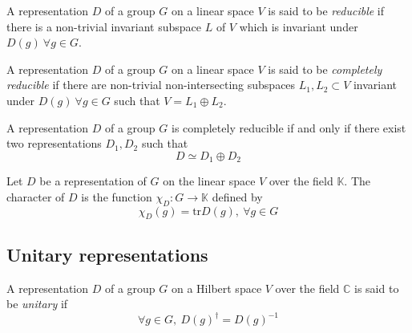 \begin{definition}
    A representation $D$ of a group $G$ on a linear space $V$ is said to be \emph{reducible} if there is a non-trivial invariant subspace $L$ of $V$ which is invariant under $D(g)\ \forall g \in G$.
\end{definition}

\begin{definition}
    A representation $D$ of a group $G$ on a linear space $V$ is said to be \emph{completely reducible} if there are non-trivial non-intersecting subspaces $L_1, L_2 \subset V$ invariant under $D(g)\ \forall g \in G$ such that $V = L_1 \oplus L_2$. 
\end{definition}

\begin{proposition}
    A representation $D$ of a group $G$ is completely reducible if and only if there exist two representations $D_1, D_2$ such that
    \begin{equation*}
        D \simeq D_1 \oplus D_2
    \end{equation*}
\end{proposition}



\begin{definition}[Character]
    Let $D$ be a representation of $G$ on the linear space $V$ over the field $\mathbb{K}$. The character of $D$ is the function $\chi_D: G \rightarrow \mathbb{K}$ defined by 
    \begin{equation*}
        \chi_D(g) = \text{tr}D(g),\ \forall g \in G
    \end{equation*} 
\end{definition}


\subsection{Unitary representations}

\begin{definition}
    A representation $D$ of a group $G$ on a Hilbert space $V$ over the field $\mathbb{C}$ is said to be \emph{unitary} if
    \begin{equation*}
        \forall g \in G,\ D(g)^{\dagger} = D(g)^{-1}
    \end{equation*}
\end{definition}

